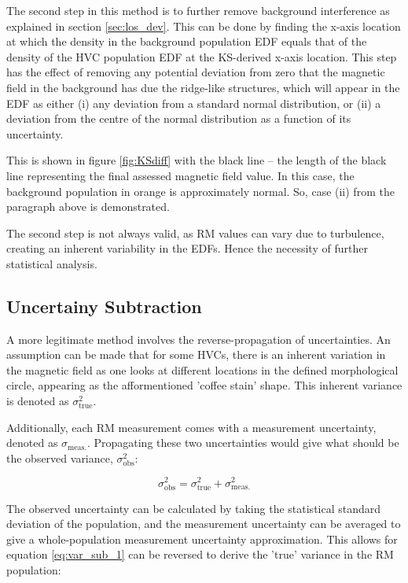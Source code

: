 The second step in this method is to further remove background interference as explained in section \ref{sec:los_dev}. This can be done by finding the x-axis location at which the density in the background population EDF equals that of the density of the HVC population EDF at the KS-derived x-axis location. This step has the effect of removing any potential deviation from zero that the magnetic field in the background has due the ridge-like structures, which will appear in the EDF as either (i) any deviation from a standard normal distribution, or (ii) a deviation from the centre of the normal distribution as a function of its uncertainty.


This is shown in figure \ref{fig:KSdiff} with the black line – the length of the black line representing the final assessed magnetic field value. In this case, the background population in orange is approximately normal. So, case (ii) from the paragraph above is demonstrated.


The second step is not always valid, as RM values can vary due to turbulence, creating an inherent variability in the EDFs. Hence the necessity of further statistical analysis.


\subsection{Uncertainy Subtraction}
\label{ssec:sigma_sub}

A more legitimate method involves the reverse-propagation of uncertainties. An assumption can be made that for some HVCs, there is an inherent variation in the magnetic field as one looks at different locations in the defined morphological circle, appearing as the afformentioned 'coffee stain' shape. This inherent variance is denoted as $\sigma_{\mathrm{true}}^2$.


Additionally, each RM measurement comes with a measurement uncertainty, denoted as $\sigma_{\mathrm{meas.}}$. Propagating these two uncertainties would give what should be the observed variance, $\sigma_{\mathrm{obs}}^2$:


\begin{equation}
    \sigma_{\mathrm{obs}}^2 = \sigma_{\mathrm{true}}^2 + \sigma_{\mathrm{meas.}}^2
\label{eq:var_sub_1}
\end{equation}


The observed uncertainty can be calculated by taking the statistical standard deviation of the population, and the measurement uncertainty can be averaged to give a whole-population measurement uncertainty approximation. This allows for equation \ref{eq:var_sub_1} can be reversed to derive the 'true' variance in the RM population:


